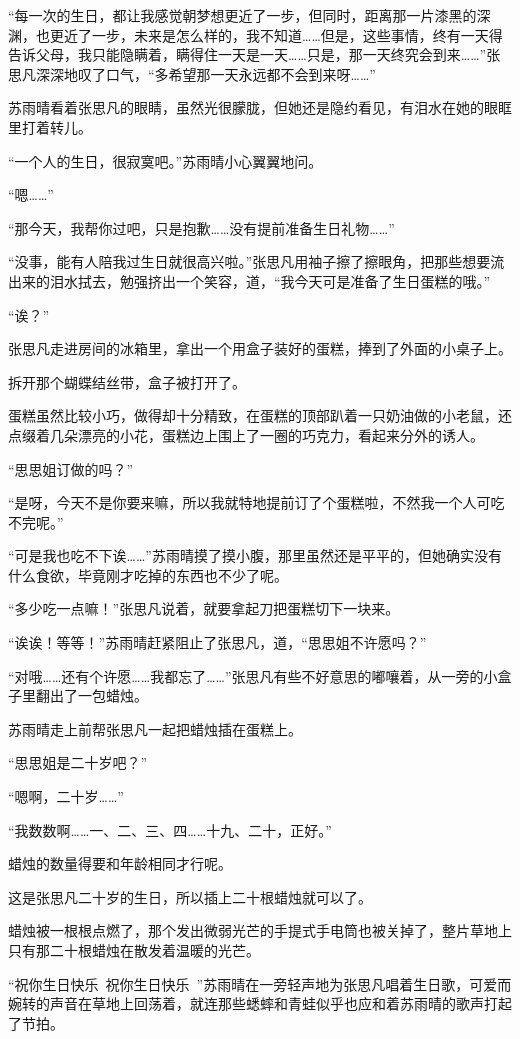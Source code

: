 “每一次的生日，都让我感觉朝梦想更近了一步，但同时，距离那一片漆黑的深渊，也更近了一步，未来是怎么样的，我不知道……但是，这些事情，终有一天得告诉父母，我只能隐瞒着，瞒得住一天是一天……只是，那一天终究会到来……”张思凡深深地叹了口气，“多希望那一天永远都不会到来呀……”

苏雨晴看着张思凡的眼睛，虽然光很朦胧，但她还是隐约看见，有泪水在她的眼眶里打着转儿。

“一个人的生日，很寂寞吧。”苏雨晴小心翼翼地问。

“嗯……”

“那今天，我帮你过吧，只是抱歉……没有提前准备生日礼物……”

“没事，能有人陪我过生日就很高兴啦。”张思凡用袖子擦了擦眼角，把那些想要流出来的泪水拭去，勉强挤出一个笑容，道，“我今天可是准备了生日蛋糕的哦。”

“诶？”

张思凡走进房间的冰箱里，拿出一个用盒子装好的蛋糕，捧到了外面的小桌子上。

拆开那个蝴蝶结丝带，盒子被打开了。

蛋糕虽然比较小巧，做得却十分精致，在蛋糕的顶部趴着一只奶油做的小老鼠，还点缀着几朵漂亮的小花，蛋糕边上围上了一圈的巧克力，看起来分外的诱人。

“思思姐订做的吗？”

“是呀，今天不是你要来嘛，所以我就特地提前订了个蛋糕啦，不然我一个人可吃不完呢。”

“可是我也吃不下诶……”苏雨晴摸了摸小腹，那里虽然还是平平的，但她确实没有什么食欲，毕竟刚才吃掉的东西也不少了呢。

“多少吃一点嘛！”张思凡说着，就要拿起刀把蛋糕切下一块来。

“诶诶！等等！”苏雨晴赶紧阻止了张思凡，道，“思思姐不许愿吗？”

“对哦……还有个许愿……我都忘了……”张思凡有些不好意思的嘟嚷着，从一旁的小盒子里翻出了一包蜡烛。

苏雨晴走上前帮张思凡一起把蜡烛插在蛋糕上。

“思思姐是二十岁吧？”

“嗯啊，二十岁……”

“我数数啊……一、二、三、四……十九、二十，正好。”

蜡烛的数量得要和年龄相同才行呢。

这是张思凡二十岁的生日，所以插上二十根蜡烛就可以了。

蜡烛被一根根点燃了，那个发出微弱光芒的手提式手电筒也被关掉了，整片草地上只有那二十根蜡烛在散发着温暖的光芒。

“祝你生日快乐~祝你生日快乐~”苏雨晴在一旁轻声地为张思凡唱着生日歌，可爱而婉转的声音在草地上回荡着，就连那些蟋蟀和青蛙似乎也应和着苏雨晴的歌声打起了节拍。


